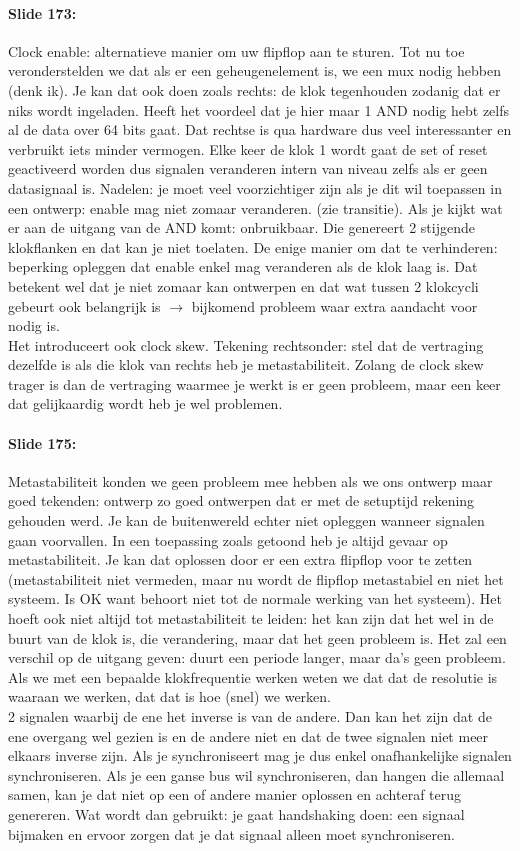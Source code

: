 \documentclass[10pt,a4paper]{book}
\begin{document}
\paragraph{Slide 173:} Clock enable: alternatieve manier om uw flipflop aan te sturen. Tot nu toe veronderstelden we dat als er een geheugenelement is, we een mux nodig hebben (denk ik). Je kan dat ook doen zoals rechts: de klok tegenhouden zodanig dat er niks wordt ingeladen. Heeft het voordeel dat je hier maar 1 AND nodig hebt zelfs al de data over 64 bits gaat. Dat rechtse is qua hardware dus veel interessanter en verbruikt iets minder vermogen. Elke keer de klok 1 wordt gaat de set of reset geactiveerd worden dus signalen veranderen intern van niveau zelfs als er geen datasignaal is. Nadelen: je moet veel voorzichtiger zijn als je dit wil toepassen in een ontwerp: enable mag niet zomaar veranderen. (zie transitie).  Als je kijkt wat er aan de uitgang van de AND komt: onbruikbaar. Die genereert 2 stijgende klokflanken en dat kan je niet toelaten. De enige manier om dat te verhinderen: beperking opleggen dat enable enkel mag veranderen als de klok laag is. Dat betekent wel dat je niet zomaar kan ontwerpen en dat wat tussen 2 klokcycli gebeurt ook belangrijk is $\rightarrow$ bijkomend probleem waar extra aandacht voor nodig is.\\
Het introduceert ook clock skew. Tekening rechtsonder: stel dat de vertraging dezelfde is als die klok van rechts heb je metastabiliteit. Zolang de clock skew trager is dan de vertraging waarmee je werkt is er geen probleem, maar een keer dat gelijkaardig wordt heb je wel problemen.

\paragraph{Slide 175:} Metastabiliteit konden we geen probleem mee hebben als we ons ontwerp maar goed tekenden: ontwerp zo goed ontwerpen dat er met de setuptijd rekening gehouden werd. Je kan de buitenwereld echter niet opleggen wanneer signalen gaan voorvallen. In een toepassing zoals getoond heb je altijd gevaar op metastabiliteit. Je kan dat oplossen door er een extra flipflop voor te zetten (metastabiliteit niet vermeden, maar nu wordt de flipflop metastabiel en niet het systeem. Is OK want behoort niet tot de normale werking van het systeem). Het hoeft ook niet altijd tot metastabiliteit te leiden: het kan zijn dat het wel in de buurt van de klok is, die verandering, maar dat het geen probleem is. Het zal een verschil op de uitgang geven: duurt een periode langer, maar da's geen probleem. Als we met een bepaalde klokfrequentie werken weten we dat dat de resolutie is waaraan we werken, dat dat is hoe (snel) we werken.\\
2 signalen waarbij de ene het inverse is van de andere. Dan kan het zijn dat de ene overgang wel gezien is en de andere niet en dat de twee signalen niet meer elkaars inverse zijn. Als je synchroniseert mag je dus enkel onafhankelijke signalen synchroniseren. Als je een ganse bus wil synchroniseren, dan hangen die allemaal samen, kan je dat niet op een of andere manier oplossen en achteraf terug genereren. Wat wordt dan gebruikt: je gaat handshaking doen: een signaal bijmaken en ervoor zorgen dat je dat signaal alleen moet synchroniseren.
\end{document}

